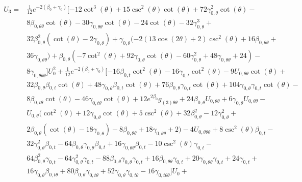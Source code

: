 \documentclass[a4paper,11pt]{article}
\numberwithin{equation}{section}
\begin{document}
\begin{align}
\begin{split} \label{eq: U_3_EM_tensor}
U_{3}=&\frac{1}{12} e^{-2 (\beta_{0}+\gamma_{0})} [-12 \cot ^3(\theta )+15 \csc ^2(\theta ) \cot (\theta )+72 \gamma_{0, \theta}^2 \cot (\theta )-\\
&8 \beta_{0, \theta \theta} \cot (\theta )-30 \gamma_{0, \theta \theta} \cot (\theta )-24 \cot (\theta )-32 \gamma_{0, \theta}^3+\\
&32 \beta_{0, \theta}^2 (\cot (\theta )-2 \gamma_{0, \theta})+\gamma_{0, \theta} (-2 (13 \cos (2 \theta )+2) \csc ^2(\theta )+16 \beta_{0, \theta \theta}+\\
&36 \gamma_{0, \theta \theta})+\beta_{0, \theta} (-7 \cot ^2(\theta )+92 \gamma_{0, \theta} \cot (\theta )-60 \gamma_{0, \theta}^2+48 \gamma_{0, \theta \theta}+24)-\\
&8 \gamma_{0, \theta \theta \theta} ] U_{0}^2+\frac{1}{12} e^{-2 (\beta_{0}+\gamma_{0})} [-16 \beta_{0, t}  \cot ^2(\theta )-16 \gamma_{0, t}  \cot ^2(\theta )-9 U_{0, \theta \theta} \cot (\theta )+\\
&32 \beta_{0, \theta} \beta_{0, t}  \cot (\theta )+48 \gamma_{0, \theta} \beta_{0, t}  \cot (\theta )+76 \beta_{0, \theta} \gamma_{0, t}  \cot (\theta )+104 \gamma_{0, \theta} \gamma_{0, t}  \cot (\theta )-\\
&8 \beta_{0, t \theta}  \cot (\theta )-46 \gamma_{0, t \theta}  \cot (\theta )+12 e^{2 \beta_{0}} g_{(3) \theta \theta}+24 \beta_{0, \theta} U_{0, \theta \theta}+6 \gamma_{0, \theta} U_{0, \theta \theta}-\\
&U_{0, \theta} (\cot ^2(\theta )+12 \gamma_{0, \theta} \cot (\theta )+5 \csc ^2(\theta )+32 \beta_{0, \theta}^2-12 \gamma_{0, \theta}^2+\\
&2 \beta_{0, \theta} (\cot (\theta )-18 \gamma_{0, \theta})-8 \beta_{0, \theta \theta}+18 \gamma_{0, \theta \theta}+2)-4 U_{0, \theta \theta \theta} +8 \csc ^2(\theta ) \beta_{0, t} -\\
&32 \gamma_{0, \theta}^2 \beta_{0, t} -64 \beta_{0, \theta} \gamma_{0, \theta} \beta_{0, t} +16 \gamma_{0, \theta \theta} \beta_{0, t} -10 \csc ^2(\theta ) \gamma_{0, t} -\\
&64 \beta_{0, \theta}^2 \gamma_{0, t} -64 \gamma_{0, \theta}^2 \gamma_{0, t} -88 \beta_{0, \theta} \gamma_{0, \theta} \gamma_{0, t} +16 \beta_{0, \theta \theta} \gamma_{0, t} +20 \gamma_{0, \theta \theta} \gamma_{0, t} +24 \gamma_{0, t} +\\
&16 \gamma_{0, \theta} \beta_{0, t \theta} +80 \beta_{0, \theta} \gamma_{0, t \theta} +52 \gamma_{0, \theta} \gamma_{0, t \theta} -16 \gamma_{0, t \theta \theta}] U_{0}+\\

\end{split}
\end{align}
\end{document}
